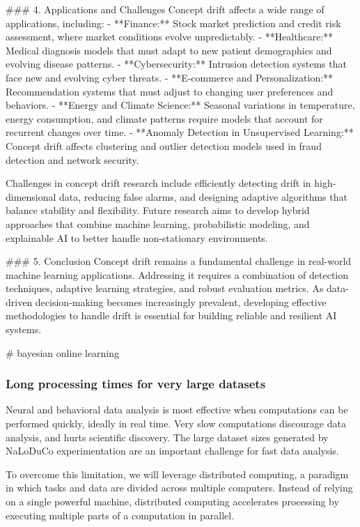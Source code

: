 \documentclass[12pt]{article}
\begin{document}
### 4. Applications and Challenges
Concept drift affects a wide range of applications, including:
- **Finance:** Stock market prediction and credit risk assessment, where market
conditions evolve unpredictably.
- **Healthcare:** Medical diagnosis models that must adapt to new patient
demographics and evolving disease patterns.
- **Cybersecurity:** Intrusion detection systems that face new and evolving
cyber threats.
- **E-commerce and Personalization:** Recommendation systems that must adjust
to changing user preferences and behaviors.
- **Energy and Climate Science:** Seasonal variations in temperature, energy
consumption, and climate patterns require models that account for recurrent
changes over time.
- **Anomaly Detection in Unsupervised Learning:** Concept drift affects
clustering and outlier detection models used in fraud detection and network
security.

Challenges in concept drift research include efficiently detecting drift in
high-dimensional data, reducing false alarms, and designing adaptive algorithms
that balance stability and flexibility. Future research aims to develop hybrid
approaches that combine machine learning, probabilistic modeling, and
explainable AI to better handle non-stationary environments.

### 5. Conclusion
Concept drift remains a fundamental challenge in real-world machine learning
applications. Addressing it requires a combination of detection techniques,
adaptive learning strategies, and robust evaluation metrics. As data-driven
decision-making becomes increasingly prevalent, developing effective
methodologies to handle drift is essential for building reliable and resilient
AI systems.


# bayesian online learning

\subsubsection*{Long processing times for very large datasets}

Neural and behavioral data analysis is most effective when computations can be
performed quickly, ideally in real time. Very slow computations discourage data
analysis, and hurts scientific discovery. The large dataset sizes generated by
NaLoDuCo experimentation are an important challenge for fast data analysis.

To overcome this limitation, we will leverage distributed computing, a paradigm
in which tasks and data are divided across multiple computers. Instead of
relying on a single powerful machine, distributed computing accelerates
processing by executing multiple parts of a computation in parallel.
\end{document}
